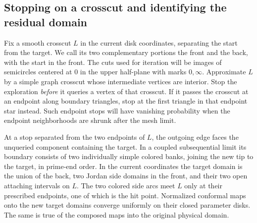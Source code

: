 \subsection{Stopping on a crosscut and identifying the residual domain}

Fix a smooth crosscut $L$ in the current disk coordinates, separating
the start from the target.  We call its two complementary portions the
front and the back, with the start in the front.  The cuts used for
iteration will be images of semicircles centered at $0$ in the upper
half-plane with marks $0,\infty$.  Approximate $L$ by a simple graph
crosscut whose intermediate vertices are interior.  Stop the
exploration \emph{before} it queries a vertex of that crosscut.  If it
passes the crosscut at an endpoint along boundary triangles, stop at
the first triangle in that endpoint star instead.  Such endpoint
stops will have vanishing probability when the endpoint neighborhoods
are shrunk after the mesh limit.

\begin{lemma}
\label{lem:stopped-domain}
At a stop separated from the two endpoints of $L$, the outgoing edge
faces the unqueried component containing the target.  In a coupled
subsequential limit its boundary consists of two individually simple
colored banks, joining the new tip to the target, in prime-end order.
In the current coordinates the target domain is the union of the
back, two Jordan side domains in the front, and their two open
attaching intervals on $L$.  The two colored side arcs meet $L$ only
at their prescribed endpoints, one of which is the hit point.
Normalized conformal maps onto the new target domains converge
uniformly on their closed parameter disks.  The same is true of the
composed maps into the original physical domain.
\end{lemma}

